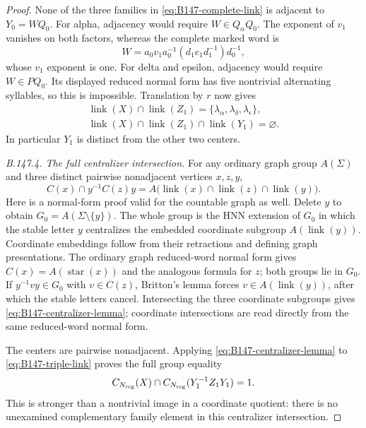 \begin{proof}
None of the three families in \eqref{eq:B147-complete-link} is
adjacent to $Y_0=WQ_0$. For alpha, adjacency would require
$W\in Q_\alpha Q_0$. The exponent of $v_1$ vanishes on both
factors, whereas the complete marked word is
\begin{equation}\label{eq:B147-W-normal}
 W=a_0v_1a_0^{-1}(d_1e_1d_1^{-1})d_0^{-1},
\end{equation}
whose $v_1$ exponent is one. For delta and epsilon, adjacency
would require $W\in PQ_0$. Its displayed reduced normal form
has five nontrivial alternating syllables, so this is impossible.
Translation by $r$ now gives
\begin{equation}\label{eq:B147-triple-link}
\begin{gathered}
 \operatorname{link}(X)\cap\operatorname{link}(Z_1)
       =\{\lambda_\alpha,\lambda_\delta,\lambda_\epsilon\},\\
 \operatorname{link}(X)\cap\operatorname{link}(Z_1)
                    \cap\operatorname{link}(Y_1)=\varnothing.
\end{gathered}
\end{equation}
In particular $Y_1$ is distinct from the other two centers.

\emph{B.147.4. The full centralizer intersection.}
For any ordinary graph group $A(\Sigma)$ and three distinct
pairwise nonadjacent vertices $x,z,y$,
\begin{equation}\label{eq:B147-centralizer-lemma}
 C(x)\cap y^{-1}C(z)y
       =A\bigl(\operatorname{link}(x)\cap\operatorname{link}(z)
                                      \cap\operatorname{link}(y)\bigr).
\end{equation}
Here is a normal-form proof valid for the countable graph as well.
Delete $y$ to obtain $G_0=A(\Sigma\setminus\{y\})$.
The whole group is the HNN extension of $G_0$ in which the stable
letter $y$ centralizes the embedded coordinate subgroup
$A(\operatorname{link}(y))$. Coordinate embeddings follow from
their retractions and defining graph presentations. The ordinary
graph reduced-word normal form gives
$C(x)=A(\operatorname{star}(x))$ and the analogous formula for
$z$; both groups lie in $G_0$. If $y^{-1}vy\in G_0$ with
$v\in C(z)$, Britton's lemma forces
$v\in A(\operatorname{link}(y))$, after which the stable letters
cancel. Intersecting the three coordinate subgroups gives
\eqref{eq:B147-centralizer-lemma}; coordinate intersections are
read directly from the same reduced-word normal form.

The centers are pairwise nonadjacent. Applying
\eqref{eq:B147-centralizer-lemma} to
\eqref{eq:B147-triple-link} proves the full group equality
\begin{equation}\label{eq:B147-full-intersection}
 C_{N_{\rm reg}}(X)\cap
 C_{N_{\rm reg}}(Y_1^{-1}Z_1Y_1)=1.
\end{equation}
This is stronger than a nontrivial image in a coordinate quotient:
there is no unexamined complementary family element in this
centralizer intersection.


\end{proof}
